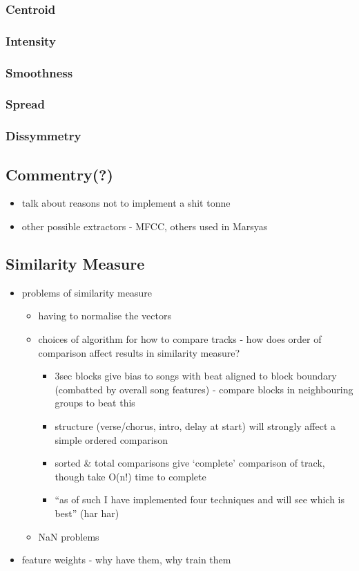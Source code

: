 \subsubsection{Centroid}
\subsubsection{Intensity}
\subsubsection{Smoothness}
\subsubsection{Spread}
\subsubsection{Dissymmetry}
\subsection{Commentry(?)}
\begin{itemize}
	\item talk about reasons not to implement a shit tonne
	\item other possible extractors - MFCC, others used in Marsyas
\end{itemize}
\subsection{Similarity Measure}
\begin{itemize}
	\item problems of similarity measure
	\begin{itemize}
		\item having to normalise the vectors
		\item choices of algorithm for how to compare tracks - how does order of comparison affect results in similarity measure?
		\begin{itemize}
			\item 3sec blocks give bias to songs with beat aligned to block boundary (combatted by overall song features) - compare blocks in neighbouring groups to beat this
			\item structure (verse/chorus, intro, delay at start) will strongly affect a simple ordered comparison
			\item sorted \& total comparisons give `complete' comparison of track, though take O(n!) time to complete
			\item ``as of such I have implemented four techniques and will see which is best'' (har har)
		\end{itemize}
		\item NaN problems
	\end{itemize}
	\item feature weights - why have them, why train them
\end{itemize}
